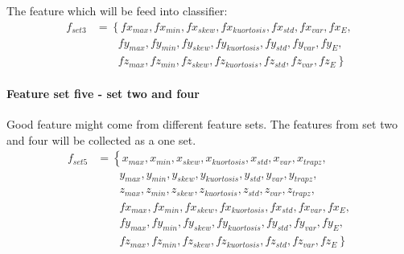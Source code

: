 \documentclass[USenglish]{ifimaster}  %
\begin{document}
The feature which will be feed into classifier:
\begin{align}
 f_{set3} &= \left\{ fx_{max},fx_{min},fx_{skew},fx_{kuortosis},fx_{std},fx_{var},fx_{E}, \right.\nonumber\\
 &\qquad \left. {} fy_{max},fy_{min},fy_{skew},fy_{kuortosis},fy_{std},fy_{var},fy_{E}, \right.\nonumber\\
 &\qquad \left. {} fz_{max},fz_{min},fz_{skew},fz_{kuortosis},fz_{std},fz_{var},fz_{E} \right\}
\end{align}

\paragraph{Feature set five - set two and four} Good feature might come from different feature sets. The features from set two and four will be collected as a one set. 
\begin{align}
f_{set5} &= \left\{ x_{max},x_{min},x_{skew},x_{kuortosis},x_{std},x_{var},x_{trapz}, \right.\nonumber\\
&\qquad \left. {}  y_{max},y_{min},y_{skew},y_{kuortosis},y_{std},y_{var},y_{trapz}, \right.\nonumber\\
&\qquad \left. {}  z_{max},z_{min},z_{skew},z_{kuortosis},z_{std},z_{var},z_{trapz}, \right.\nonumber\\
&\qquad \left. {} fx_{max},fx_{min},fx_{skew},fx_{kuortosis},fx_{std},fx_{var},fx_{E}, \right.\nonumber\\
&\qquad \left. {} fy_{max},fy_{min},fy_{skew},fy_{kuortosis},fy_{std},fy_{var},fy_{E}, \right.\nonumber\\
&\qquad \left. {} fz_{max},fz_{min},fz_{skew},fz_{kuortosis},fz_{std},fz_{var},fz_{E} \right\}
\end{align}
\newpage
\end{document}
